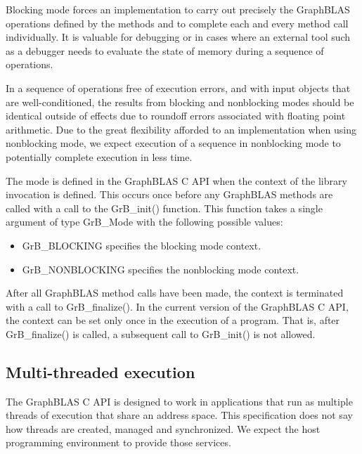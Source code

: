 Blocking mode forces an implementation to carry out precisely the
GraphBLAS operations defined by the methods and to complete each and
every method call individually.  It is valuable for debugging or in
cases where an external tool such as a debugger needs to evaluate the
state of memory during a sequence of operations.

In a sequence of operations free of execution errors, and with input
objects that are well-conditioned, the results from blocking and
nonblocking modes should be identical outside of effects due to roundoff
errors associated with floating point arithmetic.  Due to the great
flexibility afforded to an implementation when using nonblocking mode,
we expect execution of a sequence in nonblocking mode to potentially
complete execution in less time.

The mode is defined in the GraphBLAS C API when the context of the
library invocation is defined.  This occurs once before any GraphBLAS
methods are called with a call to the {\sf GrB\_init()} function.
This function takes a single argument of type {\sf GrB\_Mode} with the
following possible values:

\begin{itemize}

\item {\sf GrB\_BLOCKING} specifies the blocking mode context.

\item {\sf GrB\_NONBLOCKING} specifies the nonblocking mode context.

\end{itemize}

After all GraphBLAS method calls have been made, the context is terminated
with a call to {\sf GrB\_finalize()}.  In the current version of the
GraphBLAS C API, the context can be set only once in the execution of
a program. That is, after {\sf GrB\_finalize()} is called, a subsequent
call to {\sf GrB\_init()} is not allowed.

\subsection{Multi-threaded execution}
\label{Sec:MultiThread}


The GraphBLAS C API is designed to work in applications that run
as multiple threads of execution that share an address space.
This specification does not say how threads are created, managed and
synchronized.  We expect the host programming environment to provide
those services. 

